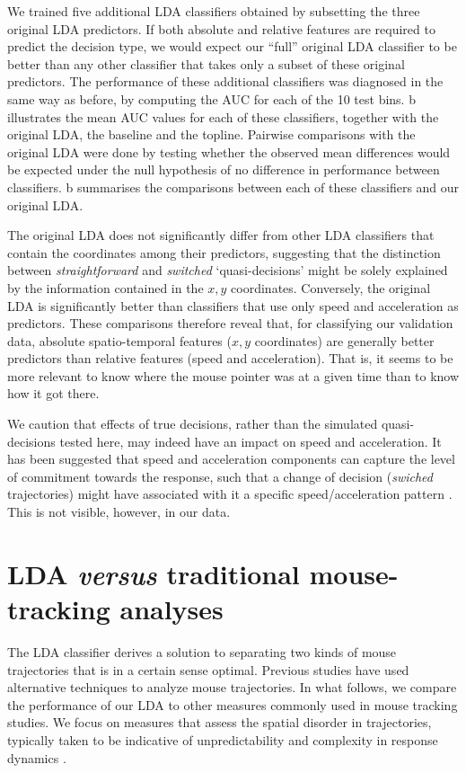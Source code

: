 \documentclass{article}
\begin{document}
We trained five additional LDA classifiers obtained by subsetting the three original LDA predictors. If both absolute and relative features are required to predict the decision type, we would expect our ``full'' original LDA classifier to be better than any other classifier that takes only a subset of these original predictors. 
The performance of these additional classifiers was diagnosed in the same way as before, by computing the AUC for each of the 10 test bins. b illustrates the mean AUC values for each of these classifiers, together with the original LDA, the baseline and the topline. 
Pairwise comparisons with the original LDA were done by testing whether the observed mean differences would be expected under the null hypothesis of no difference in performance between classifiers. b summarises the comparisons between each of these classifiers and our original LDA. 	

The original LDA does not significantly differ from other LDA classifiers that contain the coordinates among their predictors, suggesting that the distinction between \emph{straightforward} and \emph{switched} `quasi-decisions' might be solely explained by the information contained in the $x,y$ coordinates. 
Conversely, the original LDA is significantly better than classifiers that use only speed and acceleration as predictors. These comparisons therefore reveal that, for classifying our validation data, absolute spatio-temporal features ($x,y$ coordinates) are generally better predictors than relative features (speed and acceleration). That is, it seems to be more relevant to know where the mouse pointer was at a given time than to know how it got there. 

We caution that effects of true decisions, rather than the simulated quasi-decisions tested here, may indeed have an impact on speed and acceleration. It has been suggested that speed and acceleration components can capture the level of commitment towards the response, such that a change of decision (\textit{swiched} trajectories) might have associated with it a specific speed/acceleration pattern \citep{Hehman2014}. This is not visible, however, in our data.


\section{LDA \emph{versus} traditional mouse-tracking analyses}
\label{section:other-mt}
The LDA classifier derives a solution to separating two kinds of mouse trajectories that is in a certain sense optimal. Previous studies have used alternative techniques to analyze mouse trajectories. In what follows, we  compare the performance of our LDA to other measures commonly used in mouse tracking studies. We focus on measures that assess the spatial disorder in trajectories, typically taken to be indicative of unpredictability and complexity in response dynamics \citep{Hehman2014}.
\end{document}
